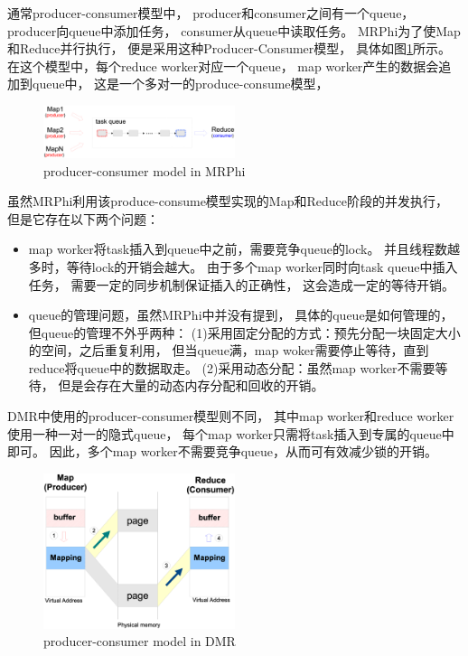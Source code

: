 通常producer-consumer模型中，
producer和consumer之间有一个queue，
producer向queue中添加任务，
consumer从queue中读取任务。
MRPhi\cite{lu2013mrphi}为了使Map和Reduce并行执行，
便是采用这种Producer-Consumer模型，
具体如图\ref{mrphi:pc-model}所示。
在这个模型中，每个reduce worker对应一个queue，
map worker产生的数据会追加到queue中，
这是一个多对一的produce-consume模型，
\begin{figure}[!h!t]  
    \centering
    \includegraphics[width=0.5\textwidth]{img/mrphi_pc_model.eps}
    \caption{producer-consumer model in MRPhi}
    \label{mrphi:pc-model}
\end{figure}
虽然MRPhi利用该produce-consume模型实现的Map和Reduce阶段的并发执行，
但是它存在以下两个问题：
\begin{itemize}  
  \item map worker将task插入到queue中之前，需要竞争queue的lock。
  并且线程数越多时，等待lock的开销会越大。
  由于多个map worker同时向task queue中插入任务，
  需要一定的同步机制保证插入的正确性，
  这会造成一定的等待开销。
  \item queue的管理问题，虽然MRPhi\cite{lu2013mrphi}中并没有提到，
  具体的queue是如何管理的，但queue的管理不外乎两种：
  (1)采用固定分配的方式：预先分配一块固定大小的空间，之后重复利用，
  但当queue满，map woker需要停止等待，直到reduce将queue中的数据取走。
  (2)采用动态分配：虽然map worker不需要等待，
  但是会存在大量的动态内存分配和回收的开销。
\end{itemize}
  DMR中使用的producer-consumer模型则不同，
  其中map worker和reduce worker使用一种一对一的隐式queue，
  每个map worker只需将task插入到专属的queue中即可。
  因此，多个map worker不需要竞争queue，从而可有效减少锁的开销。
  
  
\begin{figure}[!h!t]  
    \centering
    \includegraphics[width=0.5\textwidth]{img/dmr_pc_model.eps}
    \caption{producer-consumer model in DMR}
    \label{dmr:pc-model}
\end{figure}

